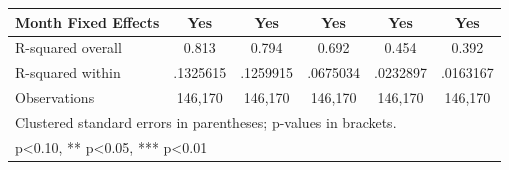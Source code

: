 {\begin{tabular}{l*{5}{c}}
Month Fixed Effects &       Yes   &       Yes   &       Yes   &       Yes   &       Yes   \\
\midrule
R-squared overall   &     0.813   &     0.794   &     0.692   &     0.454   &     0.392   \\
R-squared within    &  .1325615   &  .1259915   &  .0675034   &  .0232897   &  .0163167   \\
Observations        &   146,170   &   146,170   &   146,170   &   146,170   &   146,170   \\
\bottomrule
\multicolumn{6}{l}{\footnotesize Clustered standard errors in parentheses; p-values in brackets.}\\
\multicolumn{6}{l}{\footnotesize * p<0.10, ** p<0.05, *** p<0.01}\\
\end{tabular}
}
